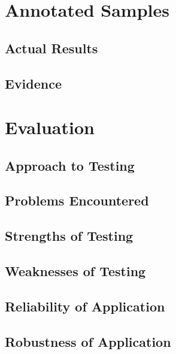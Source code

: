 \section{Annotated Samples}

\subsection{Actual Results}

\subsection{Evidence}


\section{Evaluation}

\subsection{Approach to Testing}

\subsection{Problems Encountered}

\subsection{Strengths of Testing}

\subsection{Weaknesses of Testing}

\subsection{Reliability of Application}

\subsection{Robustness of Application}